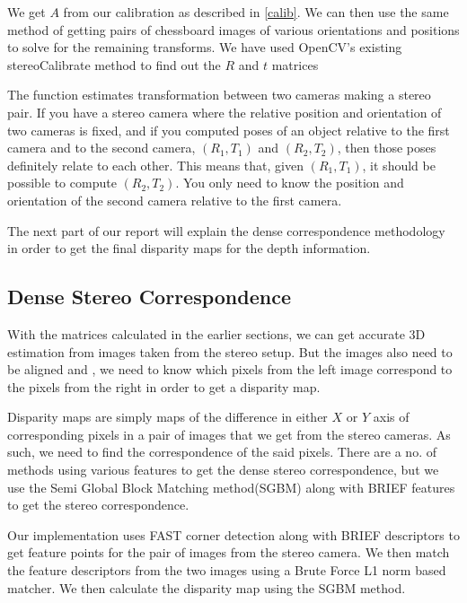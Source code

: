 \documentclass[11pt]{report}
\begin{document}
{{\begin{itemize}
\end{itemize}

We get $A$ from our calibration as described in \ref{calib}. We can then use the same method of getting pairs of chessboard images of various orientations and positions to solve for the remaining transforms. We have used OpenCV's existing stereoCalibrate method to find out the $R$ and $t$ matrices\cite{opencvdoc} 

The function estimates transformation between two cameras making a stereo pair. If you have a stereo camera where the relative position and orientation of two cameras is fixed, and if you computed poses of an object relative to the first camera and to the second camera, $(R_1, T_1)$ and $(R_2, T_2)$, then those poses definitely relate to each other. This means that, given $( R_1,T_1 )$, it should be possible to compute $( R_2,T_2 )$. You only need to know the position and orientation of the second camera relative to the first camera.

The next part of our report will explain the dense correspondence methodology in order to get the final disparity maps for the depth information.

\newpage
\label{steroc}
\subsection{Dense Stereo Correspondence}

With the matrices calculated in the earlier sections, we can get accurate 3D estimation from images taken from the stereo setup. But the images also need to be aligned and , we need to know which pixels from the left image correspond to the pixels from the right in order to get a disparity map. 

Disparity maps are simply maps of the difference in either $X$ or $Y$ axis of corresponding pixels in a pair of images that we get from the stereo cameras. As such, we need to find the correspondence of the said pixels. There are a no. of methods using various features to get the dense stereo correspondence, but we use the Semi Global Block Matching method(SGBM)\cite{hirschmuller2008stereo} along with BRIEF features\cite{brief} to get the stereo correspondence.

Our implementation uses FAST corner detection\cite{rosten_2006_machine} along with BRIEF descriptors to get feature points for the pair of images from the stereo camera. We then match the feature descriptors from the two images using a Brute Force L1 norm based matcher. We then calculate the disparity map using the SGBM method. 



}}
\end{document}
